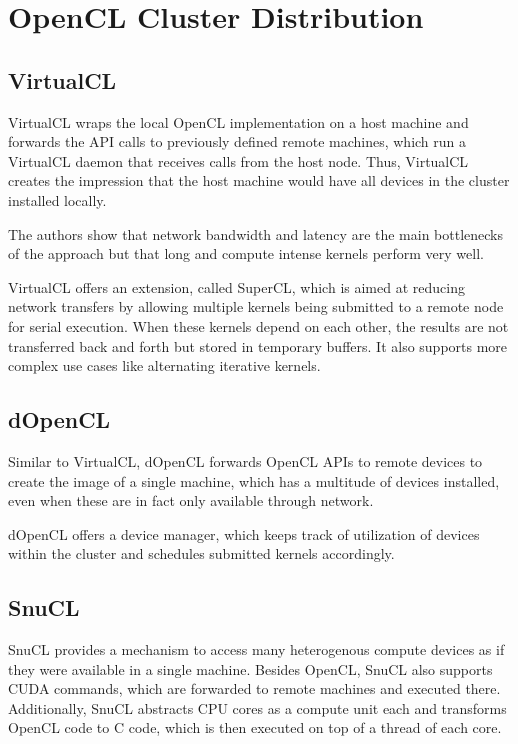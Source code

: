 \section{OpenCL Cluster Distribution}

\subsection{VirtualCL\cite{virtualcl}}

VirtualCL wraps the local OpenCL implementation on a host machine and forwards the API calls to previously defined remote machines, which run a VirtualCL daemon that receives calls from the host node. Thus, VirtualCL creates the impression that the host machine would have all devices in the cluster installed locally.

The authors show that network bandwidth and latency are the main bottlenecks of the approach but that long and compute intense kernels perform very well.

VirtualCL offers an extension, called SuperCL, which is aimed at reducing network transfers by allowing multiple kernels being submitted to a remote node for serial execution. When these kernels depend on each other, the results are not transferred back and forth but stored in temporary buffers. It also supports more complex use cases like alternating iterative kernels.

\subsection{dOpenCL\cite{dopencl}}

Similar to VirtualCL, dOpenCL forwards OpenCL APIs to remote devices to create the image of a single machine, which has a multitude of devices installed, even when these are in fact only available through network.

dOpenCL offers a device manager, which keeps track of utilization of devices within the cluster and schedules submitted kernels accordingly.

\subsection{SnuCL\cite{snucl}}

SnuCL provides a mechanism to access many heterogenous compute devices as if they were available in a single machine. Besides OpenCL, SnuCL also supports CUDA commands, which are forwarded to remote machines and executed there. Additionally, SnuCL abstracts CPU cores as a compute unit each and transforms OpenCL code to C code, which is then executed on top of a thread of each core.

